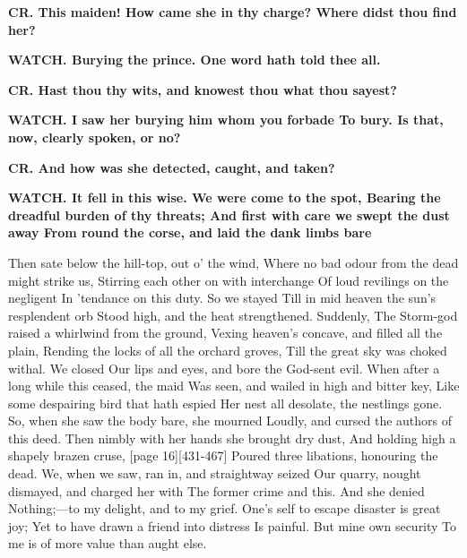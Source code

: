\documentclass[11pt,letter]{book}
\begin{document}
\par \textbf{CR. This maiden! How came she in thy charge? Where didst thou find her?}
\par 

\par \textbf{WATCH. Burying the prince. One word hath told thee all.}
\par 

\par \textbf{CR. Hast thou thy wits, and knowest thou what thou sayest?}
\par 

\par \textbf{WATCH. I saw her burying him whom you forbade To bury. Is that, now, clearly spoken, or no?}
\par 

\par \textbf{CR. And how was she detected, caught, and taken?}
\par 

\par \textbf{WATCH. It fell in this wise. We were come to the spot, Bearing the dreadful burden of thy threats; And first with care we swept the dust away From round the corse, and laid the dank limbs bare}
\par   Then sate below the hill-top, out o’ the wind, Where no bad odour from the dead might strike us, Stirring each other on with interchange Of loud revilings on the negligent In ’tendance on this duty. So we stayed Till in mid heaven the sun’s resplendent orb Stood high, and the heat strengthened. Suddenly, The Storm-god raised a whirlwind from the ground, Vexing heaven’s concave, and filled all the plain, Rending the locks of all the orchard groves, Till the great sky was choked withal. We closed Our lips and eyes, and bore the God-sent evil. When after a long while this ceased, the maid Was seen, and wailed in high and bitter key, Like some despairing bird that hath espied Her nest all desolate, the nestlings gone. So, when she saw the body bare, she mourned Loudly, and cursed the authors of this deed. Then nimbly with her hands she brought dry dust, And holding high a shapely brazen cruse, [page 16][431-467] Poured three libations, honouring the dead. We, when we saw, ran in, and straightway seized Our quarry, nought dismayed, and charged her with The former crime and this. And she denied Nothing;—to my delight, and to my grief. One’s self to escape disaster is great joy; Yet to have drawn a friend into distress Is painful. But mine own security To me is of more value than aught else.
\end{document}
